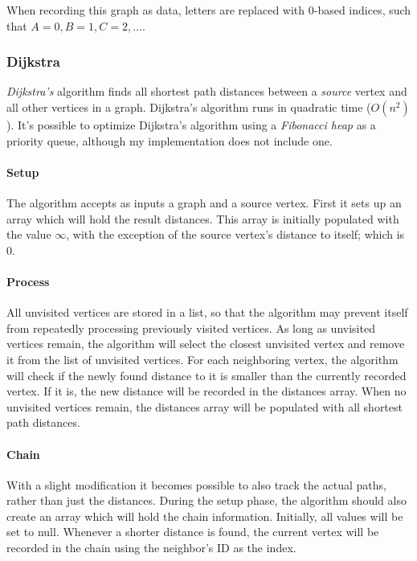 \documentclass{article}
\begin{document}
When recording this graph as data, letters are replaced with 0-based indices, such that \(A=0, B=1, C=2, \dots\).


\subsubsection{Dijkstra}
{\em Dijkstra's} algorithm finds all shortest path distances between a {\em source} vertex and all other vertices
in a graph. Dijkstra's algorithm runs in quadratic time (\(O(n^2)\)). It's possible to optimize Dijkstra's algorithm
using a {\em Fibonacci heap} as a priority queue, although my implementation does not include one.

\paragraph{Setup}
The algorithm accepts as inputs a graph and a source vertex. First it sets up an array which will hold the result
distances. This array is initially populated with the value \(\infty\), with the exception of the source vertex's
distance to itself; which is 0.

\paragraph{Process}
All unvisited vertices are stored in a list, so that the algorithm may prevent itself from repeatedly
processing previously visited vertices. As long as unvisited vertices remain, the algorithm will select the closest
unvisited vertex and remove it from the list of unvisited vertices. For each neighboring vertex, the algorithm will
check if the newly found distance to it is smaller than the currently recorded vertex. If it is, the new distance
will be recorded in the distances array. When no unvisited vertices remain, the distances array will be populated
with all shortest path distances.

\paragraph{Chain}
With a slight modification it becomes possible to also track the actual paths, rather than just the distances.
During the setup phase, the algorithm should also create an array which will hold the chain information.
Initially, all values will be set to null. Whenever a shorter distance is found, the current vertex will be
recorded in the chain using the neighbor's ID as the index.
\end{document}
